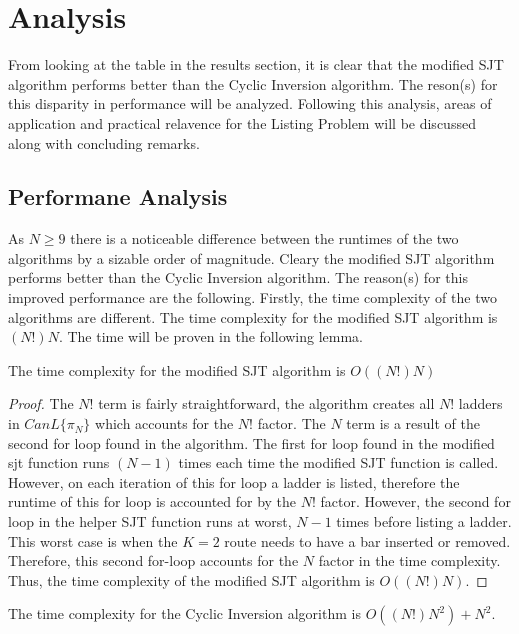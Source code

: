 
\section{Analysis}
From looking at the table in the results section, it is clear that the modified SJT algorithm performs 
better than the Cyclic Inversion algorithm. The reson(s) for this disparity in performance 
will be analyzed. Following this analysis, areas of application and practical relavence for the Listing Problem 
will be discussed along with concluding remarks.

\subsection{Performane Analysis}
    As $N \geq 9$ there is a noticeable difference between the runtimes of the two algorithms by a sizable order 
    of magnitude. Cleary the modified SJT algorithm performs better than the Cyclic Inversion algorithm. The reason(s) 
    for this improved performance are the following. Firstly, the time complexity of the two algorithms are different. 
    The time complexity for the modified SJT algorithm is $(N!)N$. The time will be proven in the following lemma.
    \begin{lemma}
        The time complexity for the modified SJT algorithm is $O((N!)N)$
    \end{lemma}
    \begin{proof}
        The $N!$ term is fairly straightforward, the algorithm creates all $N!$ ladders in $CanL\{\pi_{N}\}$ which 
        accounts for the $N!$ factor. The $N$ term is a result of the second for loop found in the algorithm. The first for loop 
        found in the modified sjt function runs $(N-1)$ times each time the modified SJT function is called. However, on each 
        iteration of this for loop a ladder is listed, therefore the runtime of this for loop is accounted for by the $N!$ factor. However, 
        the second for loop in the helper SJT function runs at worst, $N-1$ times before listing a ladder. This worst case 
        is when the $K=2$ route needs to have a bar inserted or removed. Therefore, this second for-loop accounts for the $N$ factor 
        in the time complexity. Thus, the time complexity of the modified SJT algorithm is $O((N!)N)$.
    \end{proof}
    \begin{lemma}
        \small{The time complexity for the Cyclic Inversion algorithm is $O((N!)N^{2}) + N^{2}$.}
    \end{lemma}
